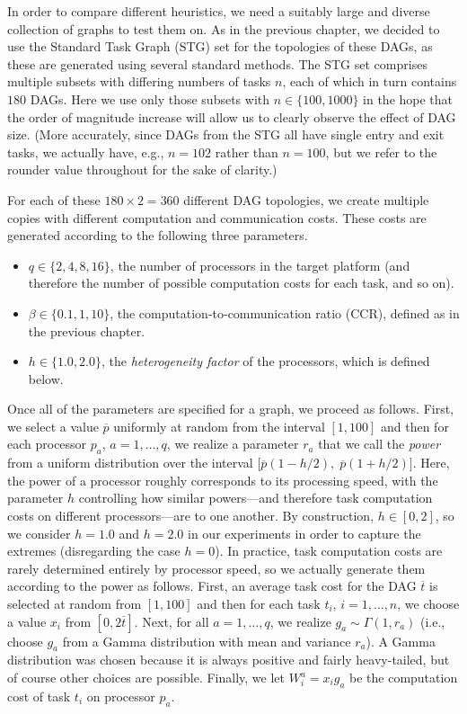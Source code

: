 \documentclass[12pt]{article}
\begin{document}
In order to compare different heuristics, we need a suitably large and diverse collection of graphs to test them on. As in the previous chapter, we decided to use the Standard Task Graph (STG) \cite{tob02} set for the topologies of these DAGs, as these are generated using several standard methods. The STG set comprises multiple subsets with differing numbers of tasks $n$, each of which in turn contains $180$ DAGs. Here we use only those subsets with $n \in \{ 100, 1000 \}$ in the hope that the order of magnitude increase will allow us to clearly observe the effect of DAG size. (More accurately, since DAGs from the STG all have single entry and exit tasks, we actually have, e.g., $n = 102$ rather than $n = 100$, but we refer to the rounder value throughout for the sake of clarity.)

For each of these $180 \times 2 = 360$ different DAG topologies, we create multiple copies with different computation and communication costs. These costs are generated according to the following three parameters.
\begin{itemize}
\item $q \in \{2, 4, 8, 16 \}$, the number of processors in the target platform (and therefore the number of possible computation costs for each task, and so on). 
\item $\beta \in \{0.1, 1, 10\}$, the computation-to-communication ratio (CCR), defined as in the previous chapter.
\item $h \in \{1.0, 2.0\}$, the {\em heterogeneity factor} of the processors, which is defined below.  
\end{itemize}
Once all of the parameters are specified for a graph, we proceed as follows. First, we select a value $\overline{p}$ uniformly at random from the interval $[1, 100]$ and then for each processor $p_a$, $a = 1, \dots, q$, we realize a parameter $r_a$ that we call the {\em power} from a uniform distribution over the interval $\big[ \overline{p} (1 - h/2), \; \overline{p} (1 + h/2)   \big]$. Here, the power of a processor roughly corresponds to its processing speed, with the parameter $h$ controlling how similar powers---and therefore task computation costs on different processors---are to one another. By construction, $h \in [0, 2]$, so we consider $h = 1.0$ and $h = 2.0$ in our experiments in order to capture the extremes (disregarding the case $h = 0$). In practice, task computation costs are rarely determined entirely by processor speed, so we actually generate them according to the power as follows. First, an average task cost for the DAG $\overline{t}$ is selected at random from $[1, 100]$ and then for each task $t_i$, $i = 1, \dots, n$, we choose a value $x_i$ from $[0, 2\overline{t}]$. Next, for all $a = 1, \dots, q$, we realize $g_a \sim \Gamma(1, r_a)$ (i.e., choose $g_a$ from a Gamma distribution with mean and variance $r_a$). A Gamma distribution was chosen because it is always positive and fairly heavy-tailed, but of course other choices are possible.  Finally, we let $W_i^a = x_i g_a$ be the computation cost of task $t_i$ on processor $p_a$.
\end{document}
